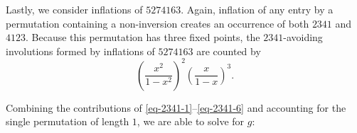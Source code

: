 \documentclass[10pt]{article}
\theoremstyle{plain}
\newcommand{\ds}{\displaystyle}
\newcommand{\pa}[1]{\left({#1}\right)}
\newcommand{\f}[2]{\ds\frac{{#1}}{{#2}}}
\begin{document}
Lastly, we consider inflations of $5274163$. Again, inflation of any entry by a permutation containing a non-inversion creates an occurrence of both $2341$ and $4123$. Because this permutation has three fixed points, the $2341$-avoiding involutions formed by inflations of $5274163$ are counted by
	\begin{equation}
	\label{eq-2341-3}
	\pa{\f{x^2}{1-x^2}}^2\pa{\f{x}{1-x}}^3.
	\end{equation}

Combining the contributions of \eqref{eq-2341-1}--\eqref{eq-2341-6} and accounting for the single permutation of length $1$, we are able to solve for $g$:
\end{document}
